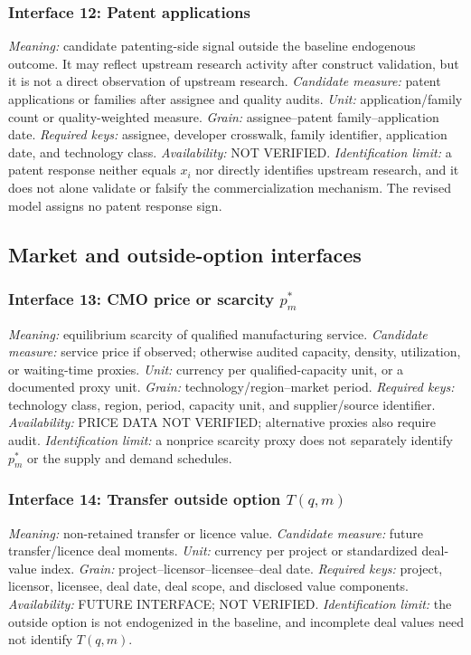 \subsubsection{Interface 12: Patent applications}
\textit{Meaning:} candidate patenting-side signal outside the baseline
endogenous outcome. It may reflect upstream research activity after construct
validation, but it is not a direct observation of upstream research.
\textit{Candidate measure:} patent applications or families after assignee
and quality audits.
\textit{Unit:} application/family count or quality-weighted measure.
\textit{Grain:} assignee--patent family--application date.
\textit{Required keys:} assignee, developer crosswalk, family identifier,
application date, and technology class.
\textit{Availability:} NOT VERIFIED.
\textit{Identification limit:} a patent response neither equals \(x_i\) nor
directly identifies upstream research, and it does not alone validate or
falsify the commercialization mechanism. The revised model assigns no patent
response sign.

\subsection{Market and outside-option interfaces}
\label{subsec:p10-market-outside}

\subsubsection{Interface 13: CMO price or scarcity \texorpdfstring{\(p_m^*\)}{equilibrium CMO price}}
\textit{Meaning:} equilibrium scarcity of qualified manufacturing service.
\textit{Candidate measure:} service price if observed; otherwise audited
capacity, density, utilization, or waiting-time proxies.
\textit{Unit:} currency per qualified-capacity unit, or a documented proxy
unit.
\textit{Grain:} technology/region--market period.
\textit{Required keys:} technology class, region, period, capacity unit, and
supplier/source identifier.
\textit{Availability:} PRICE DATA NOT VERIFIED; alternative proxies also
require audit.
\textit{Identification limit:} a nonprice scarcity proxy does not separately
identify \(p_m^*\) or the supply and demand schedules.

\subsubsection{Interface 14: Transfer outside option \texorpdfstring{\(T(q,m)\)}{transfer value}}
\textit{Meaning:} non-retained transfer or licence value.
\textit{Candidate measure:} future transfer/licence deal moments.
\textit{Unit:} currency per project or standardized deal-value index.
\textit{Grain:} project--licensor--licensee--deal date.
\textit{Required keys:} project, licensor, licensee, deal date, deal scope,
and disclosed value components.
\textit{Availability:} FUTURE INTERFACE; NOT VERIFIED.
\textit{Identification limit:} the outside option is not endogenized in the
baseline, and incomplete deal values need not identify \(T(q,m)\).

